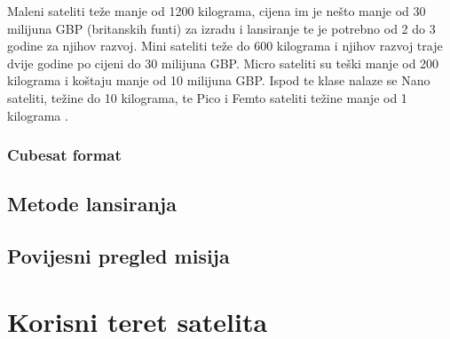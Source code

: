 \documentclass[times, utf8, diplomski, numeric]{templates/template}
\begin{document}
{{{            Maleni sateliti  teže manje od 1200 kilograma, cijena im je nešto manje od 30 milijuna GBP (britanskih funti) za izradu i lansiranje te je potrebno od 2 do 3 godine za njihov razvoj. Mini sateliti teže do 600 kilograma i njihov razvoj traje dvije godine po cijeni do 30 milijuna GBP. Micro sateliti su teški manje od 200 kilograma i koštaju manje od 10 milijuna GBP. Ispod te klase nalaze se Nano sateliti, težine do 10 kilograma, te Pico i Femto sateliti težine manje od 1 kilograma \cite{hrvatskiVojnik}.

            \subsubsection{Cubesat format}{
            }
        }
        
        \subsection{Metode lansiranja}{
        }
        
        \subsection{Povijesni pregled misija}{
        }
    }

    \section{Korisni teret satelita}{
}}
\end{document}
